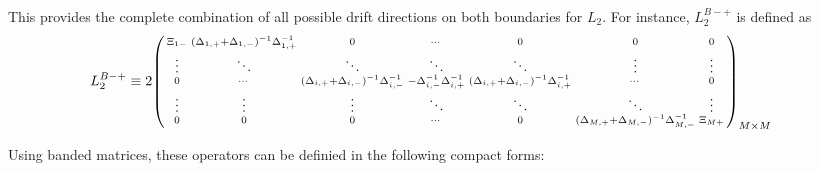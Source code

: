 \documentclass[11pt]{article}
\newenvironment{psmallmatrix}
{\left(\begin{smallmatrix}}
	{\end{smallmatrix}\right)}
\theoremstyle{definition}
\begin{document}
This provides the complete combination of all possible drift directions on both boundaries for $L_2$. For instance, $L_2^{B-+}$ is defined as
\begin{align}
L_2^{B-+} &\equiv  2 \begin{psmallmatrix}
\Xi_{1-} &
(\Delta_{1,+}+\Delta_{1,-})^{-1} \Delta_{1,+}^{-1}
&0&\cdots&0&0&0 \\
\vdots&\ddots&\ddots&\ddots&\ddots&\vdots&\vdots\\
0&\cdots&
(\Delta_{i,+}+\Delta_{i,-})^{-1} \Delta_{i,-}^{-1} &
-\Delta_{i,-}^{-1} \Delta_{i,+}^{-1}  &
(\Delta_{i,+}+\Delta_{i,-})^{-1} \Delta_{i,+}^{-1}&\cdots&0 \\
\vdots&\vdots&\vdots&\ddots&\ddots&\ddots&\vdots\\
0&0&0&\cdots&0&(\Delta_{M,+}+\Delta_{M,-})^{-1} \Delta_{M,-}^{-1}&\Xi_{M+}
\end{psmallmatrix}_{M\times M}
\end{align}



Using banded matrices, these operators can be definied in the following compact forms:
\end{document}
